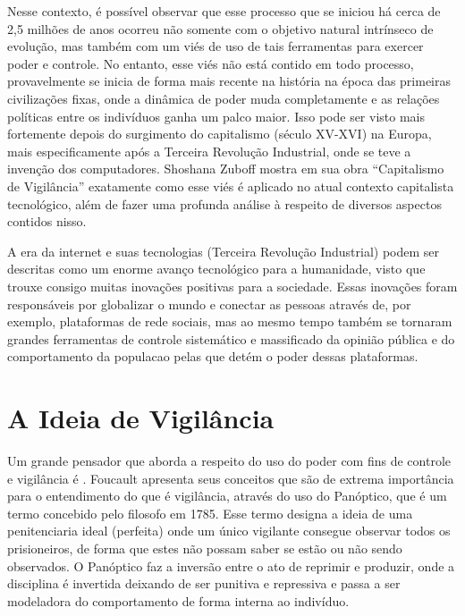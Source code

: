 \documentclass[
	12pt,
	openright,
	twoside,
	a4paper,
	english,
	french,
	spanish,
	brazil
]{abntex2}
\begin{document}
  Nesse contexto, é possível observar que esse processo que se iniciou há cerca
  de 2,5 milhões de anos ocorreu não somente com o objetivo natural intrínseco
  de evolução, mas também com um viés de uso de tais ferramentas para exercer
  poder e controle. No entanto, esse viés não está contido em todo processo,
  provavelmente se inicia de forma mais recente na história na época das
  primeiras civilizações fixas, onde a dinâmica de poder muda completamente e as
  relações políticas entre os indivíduos ganha um palco maior. Isso pode ser
  visto mais fortemente depois do surgimento do capitalismo (século XV-XVI) na
  Europa, mais especificamente após a Terceira Revolução Industrial, onde se
  teve a invenção dos computadores. Shoshana Zuboff mostra em sua obra
  ``Capitalismo de Vigilância'' exatamente como esse viés é aplicado no atual
  contexto capitalista tecnológico, além de fazer uma profunda análise à
  respeito de diversos aspectos contidos nisso.

  A era da internet e suas tecnologias (Terceira Revolução Industrial) podem ser
  descritas como um enorme avanço tecnológico para a humanidade, visto que
  trouxe consigo muitas inovações positivas para a sociedade. Essas inovações
  foram responsáveis por globalizar o mundo e conectar as pessoas através de,
  por exemplo, plataformas de rede sociais, mas ao mesmo tempo também se
  tornaram grandes ferramentas de controle sistemático e massificado da opinião
  pública e do comportamento da populacao pelas que detém o poder dessas
  plataformas.

  \chapter{A Ideia de Vigilância}

  Um grande pensador que aborda a respeito do uso do poder com fins de controle
  e vigilância é . Foucault apresenta seus
  conceitos que são de extrema importância para o entendimento do que é
  vigilância, através do uso do Panóptico, que é um termo concebido pelo
  filosofo  em 1785. Esse termo designa a ideia de
  uma penitenciaria ideal (perfeita) onde um único vigilante consegue observar
  todos os prisioneiros, de forma que estes não possam saber se estão ou não
  sendo observados. O Panóptico faz a inversão entre o ato de reprimir e
  produzir, onde a disciplina é invertida deixando de ser punitiva e repressiva
  e passa a ser modeladora do comportamento de forma interna ao indivíduo.

  \postextual

  
\end{document}
